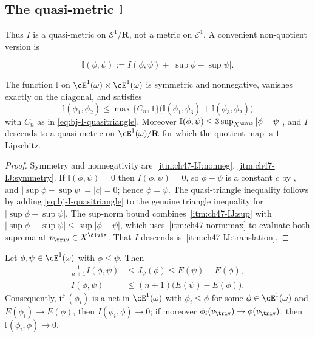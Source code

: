 \subsection{The quasi-metric \texorpdfstring{$\mathbb I$}{I}}
\label{sec:ch47-quasimetric}

Thus $I$ is a quasi-metric on $\mathcal E^1/\mathbf R$, not a metric
on $\mathcal E^1$.  A convenient non-quotient version is

\[
 \mathbb I(\phi,\psi):=I(\phi,\psi)
                 +|\sup\phi-\sup\psi|.
\tag{47.11}\label{eq:bj-I-normalized}
\]

\begin{proposition}
\label{prop:ch47-quasimetric}
The function $\mathbb I$ on $\cE^1(\omega)\times\cE^1(\omega)$ is
symmetric and nonnegative, vanishes exactly on the diagonal, and satisfies
\[
 \mathbb I(\phi_1,\phi_2)\le
 \max\{C_n,1\}\bigl(\mathbb I(\phi_1,\phi_3)+\mathbb I(\phi_3,\phi_2)\bigr)
\]
with $C_n$ as in \eqref{eq:bj-I-quasitriangle}.  Moreover
$\mathbb I(\phi,\psi)\le3\sup_{X^{\divis}}|\phi-\psi|$, and $I$
descends to a quasi-metric on $\cE^1(\omega)/\mathbf R$ for which the
quotient map is $1$-Lipschitz.
\end{proposition}

\begin{proof}
Symmetry and nonnegativity are
\,\cref{itm:ch47-IJ:nonneg},
\cref{itm:ch47-IJ:symmetry}.  If $\mathbb I(\phi,\psi)=0$ then
$I(\phi,\psi)=0$, so $\phi-\psi$ is a constant $c$ by
, and
$|\sup\phi-\sup\psi|=|c|=0$; hence $\phi=\psi$.  The quasi-triangle
inequality follows by adding \eqref{eq:bj-I-quasitriangle} to the genuine
triangle inequality for $|\sup\phi-\sup\psi|$.  The sup-norm bound
combines \,\cref{itm:ch47-IJ:sup} with
$|\sup\phi-\sup\psi|\le\sup|\phi-\psi|$, which uses
\,\cref{itm:ch47-norm:max} to evaluate
both suprema at $v_{\triv}\in X^{\divis}$.  That $I$ descends is
\,\cref{itm:ch47-IJ:translation}.
\end{proof}

\begin{corollary}
\label{cor:ch47-monotone-I}
Let $\phi,\psi\in\cE^1(\omega)$ with $\phi\le\psi$.  Then
\[
 \begin{aligned}
  \frac{1}{n+1}I(\phi,\psi)
   &\le J_\psi(\phi)\le E(\psi)-E(\phi),\\
  I(\phi,\psi)
   &\le(n+1)\bigl(E(\psi)-E(\phi)\bigr).
 \end{aligned}
\]
Consequently, if $(\phi_i)$ is a net in $\cE^1(\omega)$ with
$\phi_i\le\phi$ for some $\phi\in\cE^1(\omega)$ and
$E(\phi_i)\to E(\phi)$, then $I(\phi_i,\phi)\to0$; if moreover
$\phi_i(v_{\triv})\to\phi(v_{\triv})$, then
$\mathbb I(\phi_i,\phi)\to0$.
\end{corollary}

